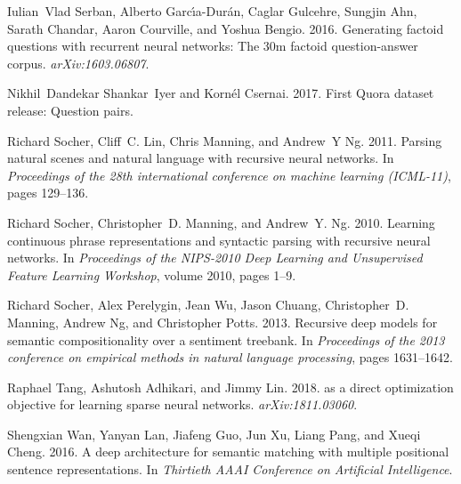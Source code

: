 \documentclass[11pt,a4paper]{article}
\begin{document}
\begin{thebibliography}{40}
Iulian~Vlad Serban, Alberto Garc{\'\i}a-Dur{\'a}n, Caglar Gulcehre, Sungjin
  Ahn, Sarath Chandar, Aaron Courville, and Yoshua Bengio. 2016.
\newblock Generating factoid questions with recurrent neural networks: The 30m
  factoid question-answer corpus.
\newblock \emph{arXiv:1603.06807}.

Nikhil~Dandekar Shankar~Iyer and Kornél Csernai. 2017.
\newblock First {Quora} dataset release: Question pairs.

Richard Socher, Cliff~C. Lin, Chris Manning, and Andrew~Y Ng. 2011.
\newblock Parsing natural scenes and natural language with recursive neural
  networks.
\newblock In \emph{Proceedings of the 28th international conference on machine
  learning (ICML-11)}, pages 129--136.

Richard Socher, Christopher~D. Manning, and Andrew~Y. Ng. 2010.
\newblock Learning continuous phrase representations and syntactic parsing with
  recursive neural networks.
\newblock In \emph{Proceedings of the NIPS-2010 Deep Learning and Unsupervised
  Feature Learning Workshop}, volume 2010, pages 1--9.

Richard Socher, Alex Perelygin, Jean Wu, Jason Chuang, Christopher~D. Manning,
  Andrew Ng, and Christopher Potts. 2013.
\newblock Recursive deep models for semantic compositionality over a sentiment
  treebank.
\newblock In \emph{Proceedings of the 2013 conference on empirical methods in
  natural language processing}, pages 1631--1642.

Raphael Tang, Ashutosh Adhikari, and Jimmy Lin. 2018.
 as a direct optimization objective for learning sparse neural
  networks.
\newblock \emph{arXiv:1811.03060}.

Shengxian Wan, Yanyan Lan, Jiafeng Guo, Jun Xu, Liang Pang, and Xueqi Cheng.
  2016.
\newblock A deep architecture for semantic matching with multiple positional
  sentence representations.
\newblock In \emph{Thirtieth AAAI Conference on Artificial Intelligence}.


\end{thebibliography}
\end{document}
